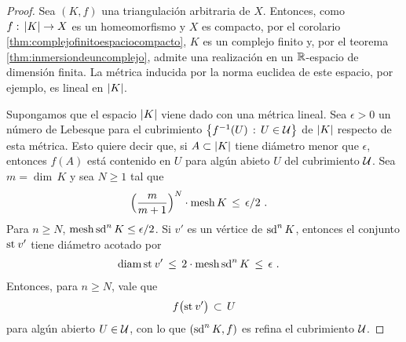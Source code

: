 \begin{proof}
	Sea $(K,f)$ una triangulaci\'{o}n arbitraria de $X$. Entonces,
	como $f:\,\geom{K}\rightarrow X$ es un homeomorfismo y $X$ es
	compacto, por el corolario \ref{thm:complejofinitoespaciocompacto},
	$K$ es un complejo finito y, por el teorema
	\ref{thm:inmersiondeuncomplejo}, admite una realizaci\'{o}n en
	un $\bb{R}$-espacio de dimensi\'{o}n finita. La m\'{e}trica inducida
	por la norma euclidea de este espacio, por ejemplo, es lineal en
	$\geom{K}$.

	Supongamos que el espacio $\geom{K}$ viene dado con una m\'{e}trica
	lineal. Sea $\epsilon >0$ un n\'{u}mero de Lebesque para el
	cubrimiento $\big\{f^{-1}(U)\,:\,U\in\cal U\big\}$ de $\geom{K}$
	respecto de esta m\'{e}trica. Esto quiere decir que, si
	$A\subset\geom{K}$ tiene di\'{a}metro menor que $\epsilon$, entonces
	$f(A)$ est\'{a} contenido en $U$ para alg\'{u}n abieto $U$ del
	cubrimiento $\cal U$. Sea $m=\dim\,K$ y sea $N\geq 1$ tal que
	\begin{align*}
		\Big(\frac{m}{m+1}\Big)^{N}\cdot\mesh K & \,\leq\,
			\epsilon / 2
		\text{ .}
	\end{align*}
	Para $n\geq N$, $\mesh{\subdiv[n]{K}}\leq\epsilon/2$. Si
	$v'$ es un v\'{e}rtice de $\subdiv[n]{K}$, entonces el conjunto
	$\estrella{v'}$ tiene di\'{a}metro acotado por
	\begin{align*}
		\diam{\estrella{v'}} & \,\leq\,2\cdot
			\mesh{\subdiv[n]{K}} \,\leq\,\epsilon
		\text{ .}
	\end{align*}
	Entonces, para $n\geq N$, vale que
	\begin{align*}
		f\big(\estrella{v'}\big)\,\subset\,U
	\end{align*}
	para alg\'{u}n abierto $U\in\cal U$, con lo que
	$(\subdiv[n]{K},f)$ es refina el cubrimiento $\cal U$.
\end{proof}

